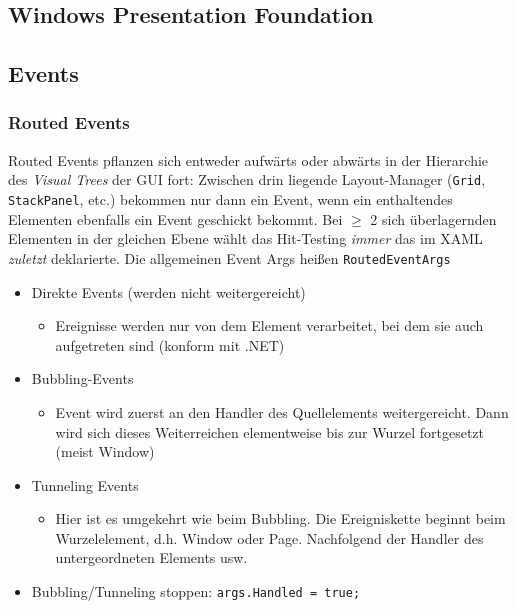 \documentclass
[
	8pt,		%
	ngerman,	%
	a4paper,	%
	landscape,	%
	final		%
]{extarticle}
\begin{document}
\begin{multicols*}{3}
	\section{Windows Presentation Foundation}
	
	
	\subsection{Events}
	
	
	\subsubsection{Routed Events}
	Routed Events pflanzen sich entweder aufwärts oder abwärts in der Hierarchie
	des \emph{Visual Trees} der GUI fort: Zwischen drin liegende Layout-Manager
	(\texttt{Grid}, \texttt{StackPanel}, etc.) bekommen nur dann ein Event, wenn
	ein enthaltendes Elementen ebenfalls ein Event geschickt bekommt. Bei \(\ge\)
	2 sich überlagernden Elementen in der gleichen Ebene wählt das Hit-Testing
	\emph{immer} das im XAML \emph{zuletzt} deklarierte. Die allgemeinen Event Args
	heißen \texttt{RoutedEventArgs}
	\begin{itemize}
		\item Direkte Events (werden nicht weitergereicht)
		      \begin{itemize}[nolistsep]
			      \item Ereignisse werden nur von dem Element verarbeitet, bei
			            dem sie auch aufgetreten sind (konform mit .NET)
		      \end{itemize}
		\item Bubbling-Events
		      \begin{itemize}[nolistsep]
			      \item Event wird zuerst an den Handler des Quellelements
			            weitergereicht. Dann wird sich dieses Weiterreichen
			            elementweise bis zur Wurzel fortgesetzt (meist Window)
		      \end{itemize}
		\item Tunneling Events
		      \begin{itemize}[nolistsep]
			      \item Hier ist es umgekehrt wie beim Bubbling. Die
			            Ereigniskette beginnt beim Wurzelelement, d.h. Window
			            oder Page. Nachfolgend der Handler des
			            untergeordneten Elements usw.
		      \end{itemize}
		\item Bubbling/Tunneling stoppen: \texttt{args.Handled = true;}
	\end{itemize}

\end{multicols*}
\end{document}

